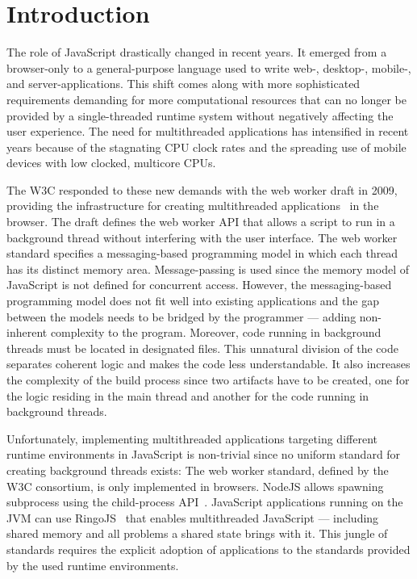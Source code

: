 \section{Introduction}\label{sec:introduction}
The role of JavaScript drastically changed in recent years. It emerged from a browser-only to a general-purpose language used to write web-, desktop-, mobile-, and server-applications. This shift comes along with more sophisticated requirements demanding for more computational resources that can no longer be provided by a single-threaded runtime system without negatively affecting the user experience. The need for multithreaded applications has intensified in recent years because of the stagnating CPU clock rates and the spreading use of mobile devices with low clocked, multicore CPUs.

The W3C responded to these new demands with the web worker draft in 2009, providing the infrastructure for creating multithreaded applications~\cite{w3cWebWorker} in the browser. The draft defines the web worker API that allows a script to run in a background thread without interfering with the user interface. The web worker standard specifies a messaging-based programming model in which each thread has its distinct memory area. Message-passing is used since the memory model of JavaScript is not defined for concurrent access. However, the messaging-based programming model does not fit well into existing applications and the gap between the models needs to be bridged by the programmer --- adding non-inherent complexity to the program. Moreover, code running in background threads must be located in designated files. This unnatural division of the code separates coherent logic and makes the code less understandable. It also increases the complexity of the build process since two artifacts have to be created, one for the logic residing in the main thread and another for the code running in background threads. 

Unfortunately, implementing multithreaded applications targeting different runtime environments in JavaScript is non-trivial since no uniform standard for creating background threads exists: The web worker standard, defined by the W3C consortium, is only implemented in browsers. NodeJS allows spawning subprocess using the child-process API~\cite{childProcess}. JavaScript applications running on the JVM can use RingoJS~\cite{RingoJS} that enables multithreaded JavaScript --- including shared memory and all problems a shared state brings with it. This jungle of standards requires the explicit adoption of applications to the standards provided by the used runtime environments.

